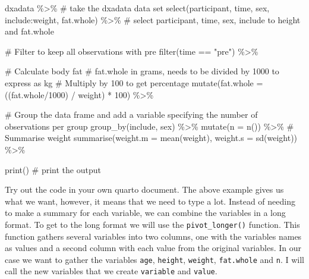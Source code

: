 \documentclass[
  11pt,
  letterpaper,
]{scrbook}
\newenvironment{Shaded}{\begin{snugshade}}{\end{snugshade}}
\newcommand{\AttributeTok}[1]{\textcolor[rgb]{0.40,0.45,0.13}{#1}}
\newcommand{\CommentTok}[1]{\textcolor[rgb]{0.37,0.37,0.37}{#1}}
\newcommand{\DecValTok}[1]{\textcolor[rgb]{0.68,0.00,0.00}{#1}}
\newcommand{\FunctionTok}[1]{\textcolor[rgb]{0.28,0.35,0.67}{#1}}
\newcommand{\NormalTok}[1]{\textcolor[rgb]{0.00,0.23,0.31}{#1}}
\newcommand{\SpecialCharTok}[1]{\textcolor[rgb]{0.37,0.37,0.37}{#1}}
\newcommand{\StringTok}[1]{\textcolor[rgb]{0.13,0.47,0.30}{#1}}
\begin{document}
\begin{Shaded}
\begin{Highlighting}[numbers=left,,]
\NormalTok{dxadata }\SpecialCharTok{\%\textgreater{}\%} \CommentTok{\# take the dxadata data set}
  \FunctionTok{select}\NormalTok{(participant, time, sex, include}\SpecialCharTok{:}\NormalTok{weight, fat.whole) }\SpecialCharTok{\%\textgreater{}\%} 
  \CommentTok{\# select participant, time, sex, include to height and fat.whole}
  
  \CommentTok{\# Filter to keep all observations with pre}
  \FunctionTok{filter}\NormalTok{(time }\SpecialCharTok{==} \StringTok{"pre"}\NormalTok{) }\SpecialCharTok{\%\textgreater{}\%}
  
  \CommentTok{\# Calculate body fat}
  \CommentTok{\# fat.whole in grams, needs to be divided by 1000 to express as kg}
  \CommentTok{\# Multiply by 100 to get percentage}
  \FunctionTok{mutate}\NormalTok{(}\AttributeTok{fat.whole =}\NormalTok{ ((fat.whole}\SpecialCharTok{/}\DecValTok{1000}\NormalTok{) }\SpecialCharTok{/}\NormalTok{ weight) }\SpecialCharTok{*} \DecValTok{100}\NormalTok{) }\SpecialCharTok{\%\textgreater{}\%}
  
  \CommentTok{\# Group the data frame and add a variable specifying the number of observations per group}
  \FunctionTok{group\_by}\NormalTok{(include, sex) }\SpecialCharTok{\%\textgreater{}\%}
  \FunctionTok{mutate}\NormalTok{(}\AttributeTok{n =} \FunctionTok{n}\NormalTok{()) }\SpecialCharTok{\%\textgreater{}\%}
  \CommentTok{\# Summarise weight}
  \FunctionTok{summarise}\NormalTok{(}\AttributeTok{weight.m =} \FunctionTok{mean}\NormalTok{(weight), }
            \AttributeTok{weight.s =} \FunctionTok{sd}\NormalTok{(weight)) }\SpecialCharTok{\%\textgreater{}\%}
  
  \FunctionTok{print}\NormalTok{() }\CommentTok{\# print the output}
\end{Highlighting}
\end{Shaded}

Try out the code in your own quarto document. The above example gives us
what we want, however, it means that we need to type a lot. Instead of
needing to make a summary for each variable, we can combine the
variables in a long format. To get to the long format we will use the
\texttt{pivot\_longer()} function. This function gathers several
variables into two columns, one with the variables names as values and a
second column with each value from the original variables. In our case
we want to gather the variables \texttt{age}, \texttt{height},
\texttt{weight}, \texttt{fat.whole} and \texttt{n}. I will call the new
variables that we create \texttt{variable} and \texttt{value}.
\end{document}
